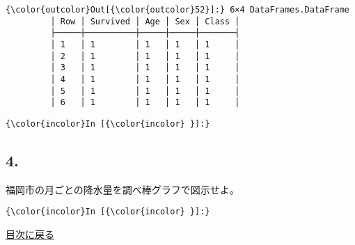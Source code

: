\documentclass[a4paper,dvipdfmx,uplatex]{jsarticle}
\begin{document}
            \begin{Verbatim}[commandchars=\\\{\}]
{\color{outcolor}Out[{\color{outcolor}52}]:} 6×4 DataFrames.DataFrame
         │ Row │ Survived │ Age │ Sex │ Class │
         ├─────┼──────────┼─────┼─────┼───────┤
         │ 1   │ 1        │ 1   │ 1   │ 1     │
         │ 2   │ 1        │ 1   │ 1   │ 1     │
         │ 3   │ 1        │ 1   │ 1   │ 1     │
         │ 4   │ 1        │ 1   │ 1   │ 1     │
         │ 5   │ 1        │ 1   │ 1   │ 1     │
         │ 6   │ 1        │ 1   │ 1   │ 1     │
\end{Verbatim}
        
    \begin{Verbatim}[commandchars=\\\{\}]
{\color{incolor}In [{\color{incolor} }]:} 
\end{Verbatim}

    \subsection{4.}\label{section}

福岡市の月ごとの降水量を調べ棒グラフで図示せよ。

    \begin{Verbatim}[commandchars=\\\{\}]
{\color{incolor}In [{\color{incolor} }]:} 
\end{Verbatim}

    \protect\hyperlink{ux76eeux6b21}{目次に戻る}


    
    
    
    
\end{document}

